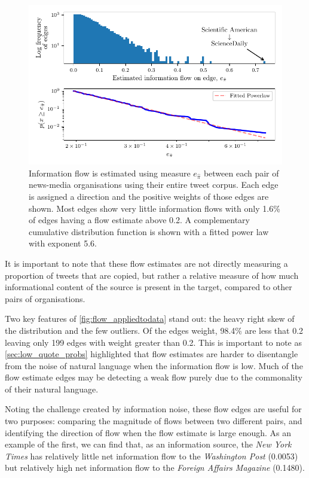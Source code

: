 \begin{figure}[!htbp]
	\centering
	\includegraphics{./chapter3/figs/edge_weights_ccdf.pdf}
	\caption{Information flow is estimated using measure $e_{\hat{\pi}}$ between each pair of news-media organisations using their entire tweet corpus. Each edge is assigned a direction and the positive weights of those edges are shown. Most edges show very little information flows with only 1.6\% of edges having a flow estimate above 0.2. A complementary cumulative distribution function is shown with a fitted power law with exponent 5.6. }
	\label{fig:flow_appliedtodata}
\end{figure}

It is important to note that these flow estimates are not directly measuring a proportion of tweets that are copied, but rather a relative measure of how much informational content of the source is present in the target, compared to other pairs of organisations. 

Two key features of \autoref{fig:flow_appliedtodata} stand out: the heavy right skew of the distribution and the few outliers. Of the edges weight, 98.4\% are less that 0.2 leaving only 199 edges with weight greater than 0.2. This is important to note as \autoref{sec:low_quote_probs} highlighted that flow estimates are harder to disentangle from the noise of natural language when the information flow is low. Much of the flow estimate edges may be detecting a weak flow purely due to the commonality of their natural language. 

Noting the challenge created by information noise, these flow edges are useful for two purposes: comparing the magnitude of flows between two different pairs, and identifying the direction of flow when the flow estimate is large enough. As an example of the first, we can find that, as an information source, the \emph{New York Times} has relatively little net information flow to the \emph{Washington Post} (0.0053) but relatively high net information flow to the \emph{Foreign Affairs Magazine} (0.1480).


